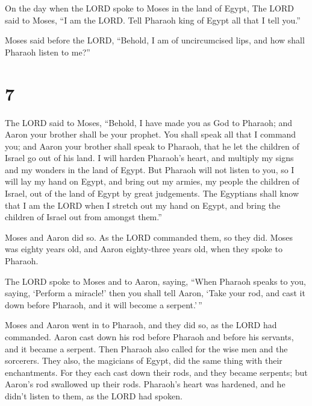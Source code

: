  On the day when the LORD spoke to Moses in the land of
Egypt,  The LORD said to Moses, ``I am the LORD. Tell
Pharaoh king of Egypt all that I tell you.''

 Moses said before the LORD, ``Behold, I am of
uncircumcised lips, and how shall Pharaoh listen to me?''

\hypertarget{section-6}{%
\section{7}\label{section-6}}

 The LORD said to Moses, ``Behold, I have made you as God to
Pharaoh; and Aaron your brother shall be your prophet.  You
shall speak all that I command you; and Aaron your brother shall speak
to Pharaoh, that he let the children of Israel go out of his land.
 I will harden Pharaoh's heart, and multiply my signs and my
wonders in the land of Egypt.  But Pharaoh will not listen
to you, so I will lay my hand on Egypt, and bring out my armies, my
people the children of Israel, out of the land of Egypt by great
judgements.  The Egyptians shall know that I am the LORD
when I stretch out my hand on Egypt, and bring the children of Israel
out from amongst them.''

 Moses and Aaron did so. As the LORD commanded them, so they
did.  Moses was eighty years old, and Aaron eighty-three
years old, when they spoke to Pharaoh.

 The LORD spoke to Moses and to Aaron, saying, 
``When Pharaoh speaks to you, saying, `Perform a miracle!' then you
shall tell Aaron, `Take your rod, and cast it down before Pharaoh, and
it will become a serpent.'\,''

 Moses and Aaron went in to Pharaoh, and they did so, as
the LORD had commanded. Aaron cast down his rod before Pharaoh and
before his servants, and it became a serpent.  Then Pharaoh
also called for the wise men and the sorcerers. They also, the magicians
of Egypt, did the same thing with their enchantments.  For
they each cast down their rods, and they became serpents; but Aaron's
rod swallowed up their rods.  Pharaoh's heart was hardened,
and he didn't listen to them, as the LORD had spoken.

